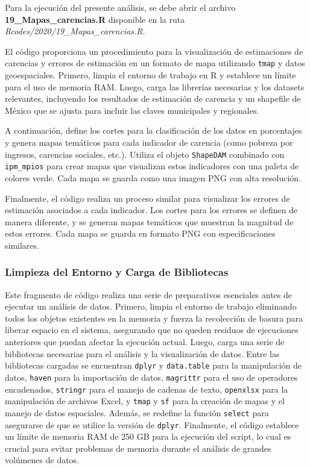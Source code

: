 \documentclass[
  12pt,
]{book}
\begin{document}
Para la ejecución del presente análisis, se debe abrir el archivo \textbf{19\_Mapas\_carencias.R} disponible en la ruta \emph{Rcodes/2020/19\_Mapas\_carencias.R}.

El código proporciona un procedimiento para la visualización de estimaciones de carencias y errores de estimación en un formato de mapa utilizando \texttt{tmap} y datos geoespaciales. Primero, limpia el entorno de trabajo en R y establece un límite para el uso de memoria RAM. Luego, carga las librerías necesarias y los datasets relevantes, incluyendo los resultados de estimación de carencia y un shapefile de México que se ajusta para incluir las claves municipales y regionales.

A continuación, define los cortes para la clasificación de los datos en porcentajes y genera mapas temáticos para cada indicador de carencia (como pobreza por ingresos, carencias sociales, etc.). Utiliza el objeto \texttt{ShapeDAM} combinado con \texttt{ipm\_mpios} para crear mapas que visualizan estos indicadores con una paleta de colores verde. Cada mapa se guarda como una imagen PNG con alta resolución.

Finalmente, el código realiza un proceso similar para visualizar los errores de estimación asociados a cada indicador. Los cortes para los errores se definen de manera diferente, y se generan mapas temáticos que muestran la magnitud de estos errores. Cada mapa se guarda en formato PNG con especificaciones similares.

\hypertarget{limpieza-del-entorno-y-carga-de-bibliotecas-11}{%
\subsubsection*{Limpieza del Entorno y Carga de Bibliotecas}\label{limpieza-del-entorno-y-carga-de-bibliotecas-11}}

Este fragmento de código realiza una serie de preparativos esenciales antes de ejecutar un análisis de datos. Primero, limpia el entorno de trabajo eliminando todos los objetos existentes en la memoria y fuerza la recolección de basura para liberar espacio en el sistema, asegurando que no queden residuos de ejecuciones anteriores que puedan afectar la ejecución actual. Luego, carga una serie de bibliotecas necesarias para el análisis y la visualización de datos. Entre las bibliotecas cargadas se encuentran \texttt{dplyr} y \texttt{data.table} para la manipulación de datos, \texttt{haven} para la importación de datos, \texttt{magrittr} para el uso de operadores encadenados, \texttt{stringr} para el manejo de cadenas de texto, \texttt{openxlsx} para la manipulación de archivos Excel, y \texttt{tmap} y \texttt{sf} para la creación de mapas y el manejo de datos espaciales. Además, se redefine la función \texttt{select} para asegurarse de que se utilice la versión de \texttt{dplyr}. Finalmente, el código establece un límite de memoria RAM de 250 GB para la ejecución del script, lo cual es crucial para evitar problemas de memoria durante el análisis de grandes volúmenes de datos.
\end{document}
